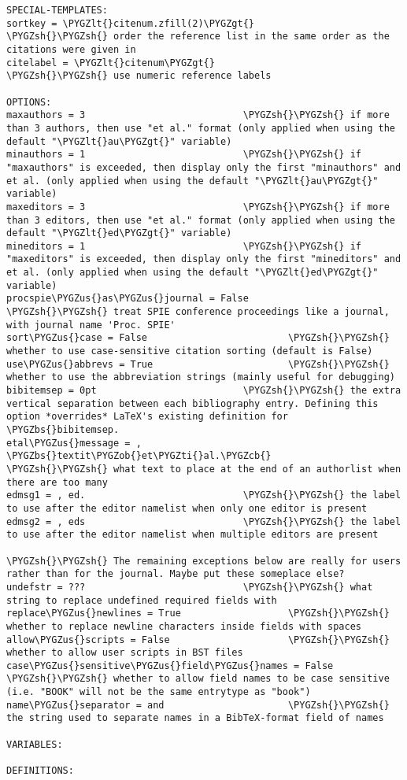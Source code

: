 \documentclass[letterpaper,10pt,english]{sphinxmanual}
\def\PYGZbs{\char`\\}
\def\PYGZus{\char`\_}
\def\PYGZob{\char`\{}
\def\PYGZcb{\char`\}}
\def\PYGZlt{\char`\<}
\def\PYGZgt{\char`\>}
\def\PYGZsh{\char`\#}
\def\PYGZti{\char`\~}
\begin{document}
\begin{Verbatim}[commandchars=\\\{\}]
SPECIAL-TEMPLATES:
sortkey = \PYGZlt{}citenum.zfill(2)\PYGZgt{}              \PYGZsh{}\PYGZsh{} order the reference list in the same order as the citations were given in
citelabel = \PYGZlt{}citenum\PYGZgt{}                     \PYGZsh{}\PYGZsh{} use numeric reference labels

OPTIONS:
maxauthors = 3                            \PYGZsh{}\PYGZsh{} if more than 3 authors, then use "et al." format (only applied when using the default "\PYGZlt{}au\PYGZgt{}" variable)
minauthors = 1                            \PYGZsh{}\PYGZsh{} if "maxauthors" is exceeded, then display only the first "minauthors" and et al. (only applied when using the default "\PYGZlt{}au\PYGZgt{}" variable)
maxeditors = 3                            \PYGZsh{}\PYGZsh{} if more than 3 editors, then use "et al." format (only applied when using the default "\PYGZlt{}ed\PYGZgt{}" variable)
mineditors = 1                            \PYGZsh{}\PYGZsh{} if "maxeditors" is exceeded, then display only the first "mineditors" and et al. (only applied when using the default "\PYGZlt{}ed\PYGZgt{}" variable)
procspie\PYGZus{}as\PYGZus{}journal = False               \PYGZsh{}\PYGZsh{} treat SPIE conference proceedings like a journal, with journal name 'Proc. SPIE'
sort\PYGZus{}case = False                         \PYGZsh{}\PYGZsh{} whether to use case-sensitive citation sorting (default is False)
use\PYGZus{}abbrevs = True                        \PYGZsh{}\PYGZsh{} whether to use the abbreviation strings (mainly useful for debugging)
bibitemsep = 0pt                          \PYGZsh{}\PYGZsh{} the extra vertical separation between each bibliography entry. Defining this option *overrides* LaTeX's existing definition for \PYGZbs{}bibitemsep.
etal\PYGZus{}message = , \PYGZbs{}textit\PYGZob{}et\PYGZti{}al.\PYGZcb{}          \PYGZsh{}\PYGZsh{} what text to place at the end of an authorlist when there are too many
edmsg1 = , ed.                            \PYGZsh{}\PYGZsh{} the label to use after the editor namelist when only one editor is present
edmsg2 = , eds                            \PYGZsh{}\PYGZsh{} the label to use after the editor namelist when multiple editors are present

\PYGZsh{}\PYGZsh{} The remaining exceptions below are really for users rather than for the journal. Maybe put these someplace else?
undefstr = ???                            \PYGZsh{}\PYGZsh{} what string to replace undefined required fields with
replace\PYGZus{}newlines = True                   \PYGZsh{}\PYGZsh{} whether to replace newline characters inside fields with spaces
allow\PYGZus{}scripts = False                     \PYGZsh{}\PYGZsh{} whether to allow user scripts in BST files
case\PYGZus{}sensitive\PYGZus{}field\PYGZus{}names = False        \PYGZsh{}\PYGZsh{} whether to allow field names to be case sensitive (i.e. "BOOK" will not be the same entrytype as "book")
name\PYGZus{}separator = and                      \PYGZsh{}\PYGZsh{} the string used to separate names in a BibTeX-format field of names

VARIABLES:

DEFINITIONS:
\end{Verbatim}
\end{document}
